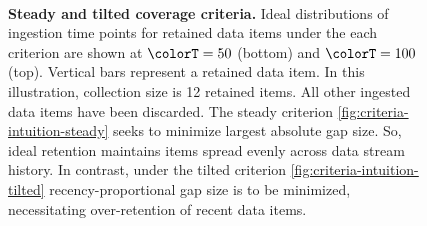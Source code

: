 \begin{figure}
\begin{minipage}[t]{\linewidth}
    \begin{minipage}[]{\textwidth}
    \noindent{}%
    \hspace{-1.5ex}%
    {\vrule width 1pt}%
    \noindent{}%
    {\vrule width 1pt}%
    \noindent{}%
    \end{minipage}
\end{minipage}%
\begin{minipage}[t]{0.04\textwidth}
~
\end{minipage}

\begin{minipage}[t]{\linewidth}
    \vspace{-2ex}%
    \caption{%
      \textbf{Steady and tilted coverage criteria.}
      \footnotesize
      Ideal distributions of ingestion time points for retained data items under the each criterion are shown at $\colorT=50$ (bottom) and $\colorT=100$ (top).
      Vertical bars represent a retained data item.
      In this illustration, collection size is 12 retained items.
      All other ingested data items have been discarded.
      The steady criterion \ref{fig:criteria-intuition-steady} seeks to minimize largest absolute gap size.
      So, ideal retention maintains items spread evenly across data stream history.
      In contrast, under the tilted criterion \ref{fig:criteria-intuition-tilted} recency-proportional gap size is to be minimized, necessitating over-retention of recent data items.
      }
    \label{fig:criteria-intuition}
\end{minipage}
\end{figure}
